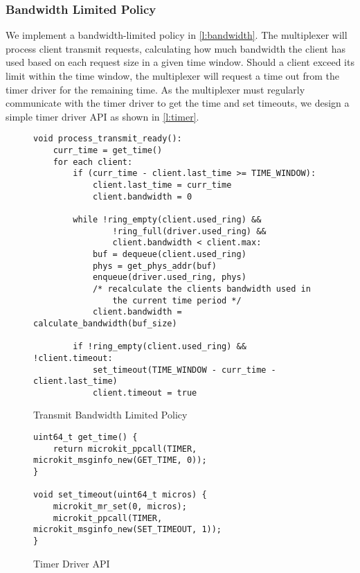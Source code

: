 \subsubsection{Bandwidth Limited Policy}\label{s:bandwidth}

We implement a bandwidth-limited policy in \autoref{l:bandwidth}. The multiplexer will 
process client transmit requests, calculating how much bandwidth the client has used based on
each request size in a given time window. Should a client exceed its limit within the time window,
the multiplexer will request a time out from the timer driver for the remaining time. As the multiplexer must
regularly communicate with the timer driver to get the time and set timeouts, we design a simple timer driver
API as shown in \autoref{l:timer}. 

\begin{figure} [H]
    \begin{verbatim}
void process_transmit_ready():
    curr_time = get_time()
    for each client:
        if (curr_time - client.last_time >= TIME_WINDOW):
            client.last_time = curr_time
            client.bandwidth = 0
        
        while !ring_empty(client.used_ring) && 
                !ring_full(driver.used_ring) && 
                client.bandwidth < client.max:
            buf = dequeue(client.used_ring)
            phys = get_phys_addr(buf)
            enqueue(driver.used_ring, phys)
            /* recalculate the clients bandwidth used in 
                the current time period */ 
            client.bandwidth = calculate_bandwidth(buf_size)

        if !ring_empty(client.used_ring) && !client.timeout:
            set_timeout(TIME_WINDOW - curr_time - client.last_time)
            client.timeout = true
\end{verbatim}
\caption{Transmit Bandwidth Limited Policy}
\label{l:bandwidth}
\end{figure}

\begin{figure} [H]
    \begin{verbatim}
uint64_t get_time() {
    return microkit_ppcall(TIMER, microkit_msginfo_new(GET_TIME, 0));
}
        
void set_timeout(uint64_t micros) {
    microkit_mr_set(0, micros);
    microkit_ppcall(TIMER, microkit_msginfo_new(SET_TIMEOUT, 1));
}
\end{verbatim}
\caption{Timer Driver API}
\label{l:timer}
\end{figure}

